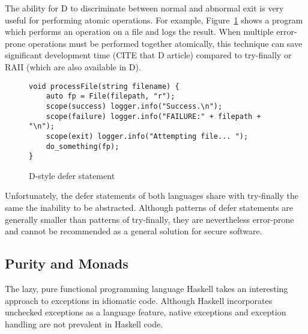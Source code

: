 \documentclass[11pt]{article}
\newcommand{\maybePage}{\newpage}
\begin{document}
The ability for D to discriminate between normal and abnormal exit is very useful for performing atomic operations.
For example, Figure~\ref{Dscope} shows a program which performs an operation on a file and logs the result.
When multiple error-prone operations must be performed together atomically, this technique can save significant development time (CITE that D article) compared to try-finally or RAII (which are also available in D).

\begin{figure}[H]
\caption{D-style defer statement}
\label{Dscope}

\begin{verbatim}
void processFile(string filename) {
    auto fp = File(filepath, "r");
    scope(success) logger.info("Success.\n");
    scope(failure) logger.info("FAILURE:" + filepath + "\n");
    scope(exit) logger.info("Attempting file... ");
    do_something(fp);
}
\end{verbatim}

\end{figure}

Unfortunately, the defer statements of both languages share with try-finally the same the inability to be abstracted.
Although patterns of defer statements are generally smaller than patterns of try-finally, they are nevertheless error-prone and cannot be recommended as a general solution for secure software.




\maybePage
\subsection{Purity and Monads}
\label{subsec:exceptionMonads}
The lazy, pure functional programming language Haskell takes an interesting approach to exceptions in idiomatic code.
Although Haskell incorporates unchecked exceptions as a language feature, native exceptions and exception handling are not prevalent in Haskell code.
\end{document}
